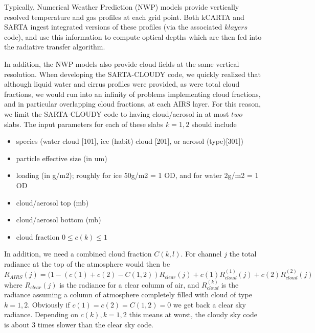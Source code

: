 \documentclass[11pt]{article}
\newcommand{\kc}{\textsf{kCARTA}\xspace}
\newcommand{\sa}{\textsf{SARTA}\xspace}
\newcommand{\sasc}{\textsf{SARTA-CLOUDY}\xspace}
\begin{document}
Typically, Numerical Weather Prediction (NWP) models provide vertically resolved temperature and gas profiles at each 
grid point. Both \kc and \sa ingest integrated versions of these profiles (via the associated $klayers$ code), and use 
this information to compute optical depths which are then fed into the radiative transfer algorithm.

In addition, the NWP models also provide cloud fields at the same vertical resolution. When developing the \sasc code, we
quickly realized that although liquid water and cirrus profiles were provided, as were total cloud fractions, we would 
run into an infinity of problems implementing cloud fractions, and in particular overlapping cloud fractions, at each 
AIRS layer. For this reason, we limit the \sasc code to having cloud/aerosol in at most $two$ slabs. The input parameters
for each of these slabs $k=1,2$ 
 should include
\begin{itemize}
\item species (water cloud [101], ice (habit) cloud [201], or aerosol (type)[301])
\item particle effective size (in um)
\item loading (in g/m2); roughly for ice 50g/m2 = 1 OD, and for water 2g/m2 = 1 OD
\item cloud/aerosol top (mb)
\item cloud/aerosol bottom (mb)
\item cloud fraction $0 \le c(k) \le 1$
\end{itemize}

In addition, we need a combined cloud fraction $C(k,l)$. For channel $j$ the total radiance at the top of the atmosphere 
would then be
\[
R_{AIRS}(j) = (1 -  (c(1) + c(2) - C(1,2)) R_{clear}(j) + c(1) R^{(1)}_{cloud}(j) + c(2) R^{(2)}_{cloud}(j)
\]
where $R_{clear}(j)$ is the radiance for a clear column of air, and $R^{(k)}_{cloud}$ is the radiance assuming 
a column of atmosphere completely filled with cloud of type $k=1,2$. Obviously if $c(1) = c(2) = C(1,2) = 0$ we get 
back a clear sky radiance. Depending on $c(k),k=1,2$ this means at worst, the cloudy sky code is about 3 times 
slower than the clear sky code.

\end{document}
